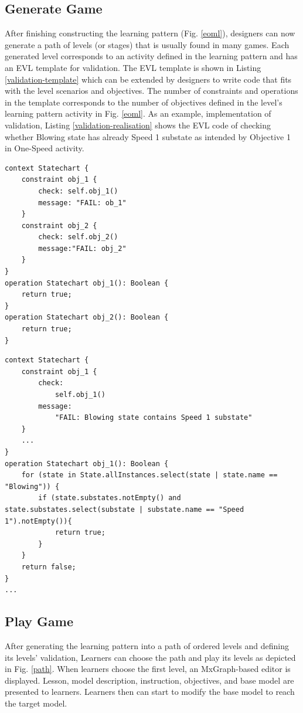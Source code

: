 \documentclass[conference]{IEEEtran}
\begin{document}
\subsection{Generate Game}
After finishing constructing the learning pattern (Fig. \ref{eoml}), designers can now generate a path of levels (or stages) that is usually found in many games. Each generated level corresponds to an activity defined in the learning pattern and has an EVL template for validation. The EVL template is shown in Listing \ref{validation-template} which can be extended by designers to write code that fits with the level scenarios and objectives. The number of constraints and operations in the template corresponds to the number of objectives defined in the level's learning pattern activity in Fig. \ref{eoml}. As an example, implementation of validation, Listing \ref{validation-realisation} shows the EVL code of checking whether Blowing state has already Speed 1 substate as intended by Objective 1 in One-Speed activity.   

\begin{lstlisting}[style=interfaces,caption={Validation template for objectives in One-Speed Fan activity/level.},label=validation-template]
context Statechart {
    constraint obj_1 {
        check: self.obj_1()
        message: "FAIL: ob_1"
    }
    constraint obj_2 {
        check: self.obj_2()
        message:"FAIL: obj_2"
    }        
}
operation Statechart obj_1(): Boolean {
    return true;
}
operation Statechart obj_2(): Boolean {
    return true;
}
\end{lstlisting} 


\begin{lstlisting}[style=interfaces,caption={Validation realisation for Objective 1 in One-Speed Fan activity/level.}, label=validation-realisation]
context Statechart {
    constraint obj_1 {
        check: 
            self.obj_1()
        message:
            "FAIL: Blowing state contains Speed 1 substate"
    }
    ...
}
operation Statechart obj_1(): Boolean {
    for (state in State.allInstances.select(state | state.name == "Blowing")) {
        if (state.substates.notEmpty() and state.substates.select(substate | substate.name == "Speed 1").notEmpty()){
            return true;
        }        
    }
    return false;
}
...
\end{lstlisting} 

\subsection{Play Game}
After generating the learning pattern into a path of ordered levels and defining its levels' validation, Learners can choose the path and play its levels as depicted in Fig. \ref{path}. When learners choose the first level, an MxGraph-based editor is displayed. Lesson, model description, instruction, objectives, and base model are presented to learners. Learners then can start to modify the base model to reach the target model. 
\end{document}
